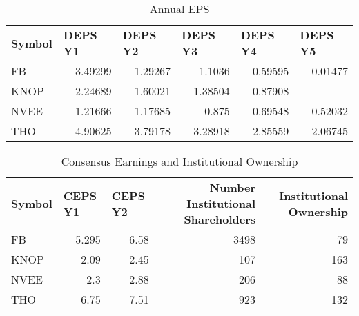 \documentclass{article}
\begin{document}
\begin{table}[htbp]
  \caption{Annual EPS}
    \begin{tabular}{lrrrrr}
    \textbf{Symbol} & \multicolumn{1}{l}{\textbf{DEPS Y1}} & \multicolumn{1}{l}{\textbf{DEPS Y2}} & \multicolumn{1}{l}{\textbf{DEPS Y3}} & \multicolumn{1}{l}{\textbf{DEPS Y4}} & \multicolumn{1}{l}{\textbf{DEPS Y5}} \\
    FB    & 3.49299 & 1.29267 & 1.1036 & 0.59595 & 0.01477 \\
    KNOP  & 2.24689 & 1.60021 & 1.38504 & 0.87908 &  \\
    NVEE  & 1.21666 & 1.17685 & 0.875 & 0.69548 & 0.52032 \\
    THO   & 4.90625 & 3.79178 & 3.28918 & 2.85559 & 2.06745 \\
    \end{tabular}%
  \label{tab:addlabel}%
\end{table}%

\begin{table}[htbp]
  \caption{Consensus Earnings and Institutional Ownership}
    \begin{tabular}{lrrrr}
    \textbf{Symbol} & \multicolumn{1}{l}{\textbf{CEPS Y1}} & \multicolumn{1}{l}{\textbf{CEPS Y2}} & \multicolumn{1}{p{4.215em}}{\textbf{Number Institutional Shareholders}} & \multicolumn{1}{p{4.215em}}{\textbf{Institutional Ownership}} \\
    FB    & 5.295 & 6.58  & 3498  & 79 \\
    KNOP  & 2.09  & 2.45  & 107   & 163 \\
    NVEE  & 2.3   & 2.88  & 206   & 88 \\
    THO   & 6.75  & 7.51  & 923   & 132 \\
    \end{tabular}%
  \label{tab:addlabel}%
\end{table}%
\end{document}
